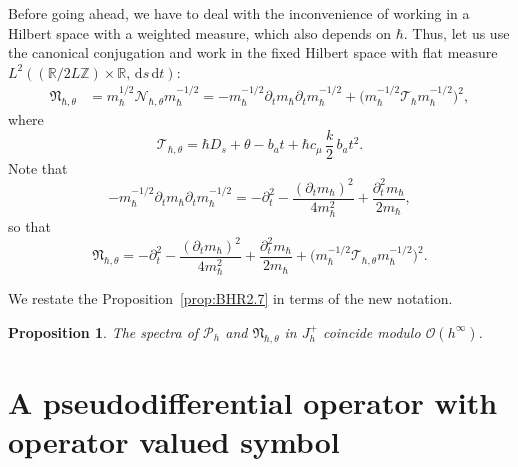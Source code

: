 \documentclass[JEP,XML,SOM,Unicode,NoFloatCountersInSection,published]{cedram}
\newcommand{\rd}{\,\mathrm{d}}
\newcommand{\cP}{\mathcal{P}}
\theoremstyle{plain}
\newtheorem{proposition}[theorem]{Proposition}
\theoremstyle{definition}
\newcommand{\R}{\mathbb{R}}
\newcommand{\Z}{\mathbb{Z}}
\begin{document}
Before going ahead, we have to deal with the inconvenience of working in a Hilbert space with a weighted measure, which also depends on $\hbar$. Thus, let us use the canonical conjugation and work in the fixed Hilbert space with flat measure
\hbox{$L^2((\R/2L\Z)\times\R,\rd s\rd t)$}:
\begin{equation}\label{eq:Nhc0}
\begin{aligned}
\mathfrak N_{\hbar,\theta}&=m_\hbar^{1/2}\mathcal N_{\hbar,\theta}m_\hbar^{-1/2}=-m^{-1/2}_{\hbar}\partial_t m_{\hbar}\partial_t m_{\hbar}^{-1/2}+\bigl(m_\hbar^{-1/2} \mathcal T_\hbar m_\hbar^{-1/2}\bigr)^2,
\end{aligned}
\end{equation}
where\vspace*{-3pt}
\begin{equation}\label{eq.Th}
\mathcal T_{\hbar,\theta}= \hbar D_s+\theta-b_at+\hbar c_\mu\,\frac{k}{2}\,b_at^2.
\end{equation}
Note that\vspace*{-3pt}
\begin{equation}\label{eq.transverse}
-m^{-1/2}_{\hbar}\partial_t m_{\hbar}\partial_t m_{\hbar}^{-1/2}=-\partial^2_t-\frac{(\partial_tm_\hbar)^2}{4m^2_\hbar}+\frac{\partial^2_tm_\hbar}{2m_\hbar},
\end{equation}
so that\vspace*{-3pt}
\begin{equation}\label{eq:Nhc}
\mathfrak N_{\hbar,\theta}=-\partial^2_t-\frac{(\partial_tm_\hbar)^2}{4m^2_\hbar}+\frac{\partial^2_tm_\hbar}{2m_\hbar}+\bigl(m_\hbar^{-1/2} \mathcal T_{\hbar,\theta} m_\hbar^{-1/2}\bigr)^2.
\end{equation}

We restate the Proposition~\ref{prop:BHR2.7} in terms of the new notation.
\begin{proposition}\label{prop:BHR2.7-bis}
The spectra of $\cP_h$ and $\mathfrak N_{\hbar,\theta}$ in $J^+_h$ coincide modulo $\mathcal{O}(h^{\infty})$.
\end{proposition}

\section{A pseudodifferential operator with operator valued symbol}\label{sec:pseudo}
\end{document}
